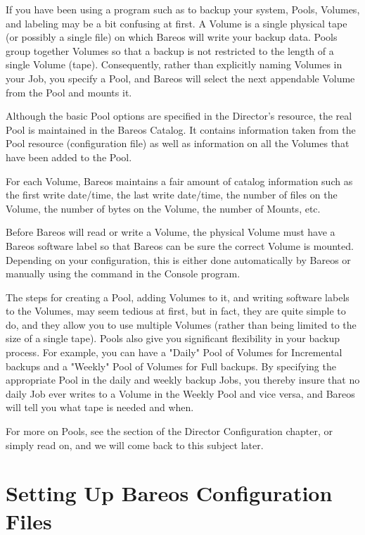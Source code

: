 If you have been using a program such as  to backup your system,
Pools, Volumes, and labeling may be a bit confusing at first. A Volume is a
single physical tape (or possibly a single file) on which Bareos will write
your backup data. Pools group together Volumes so that a backup is not
restricted to the length of a single Volume (tape). Consequently, rather than
explicitly naming Volumes in your Job, you specify a Pool, and Bareos will
select the next appendable Volume from the Pool and mounts it.

Although the basic Pool options are specified in the Director's  resource,
the real Pool is maintained in the Bareos Catalog. It contains
information taken from the Pool resource (configuration file) as well as
information on all the Volumes that have been added to the Pool.

For each Volume, Bareos maintains a fair amount of catalog information such as
the first write date/time, the last write date/time, the number of files on
the Volume, the number of bytes on the Volume, the number of Mounts, etc.

Before Bareos will read or write a Volume, the physical Volume must have a
Bareos software label so that Bareos can be sure the correct Volume is
mounted.
Depending on your configuration,
this is either done automatically by Bareos
or manually using the  command in the Console
program.

The steps for creating a Pool, adding Volumes to it, and writing software
labels to the Volumes, may seem tedious at first, but in fact, they are quite
simple to do, and they allow you to use multiple Volumes (rather than being
limited to the size of a single tape). Pools also give you significant
flexibility in your backup process. For example, you can have a "Daily" Pool
of Volumes for Incremental backups and a "Weekly" Pool of Volumes for Full
backups. By specifying the appropriate Pool in the daily and weekly backup
Jobs, you thereby insure that no daily Job ever writes to a Volume in the
Weekly Pool and vice versa, and Bareos will tell you what tape is needed and
when.

For more on Pools, see the
 section of the Director
Configuration chapter, or simply read on, and we will come back to this
subject later.

\section{Setting Up Bareos Configuration Files}
\label{config}

